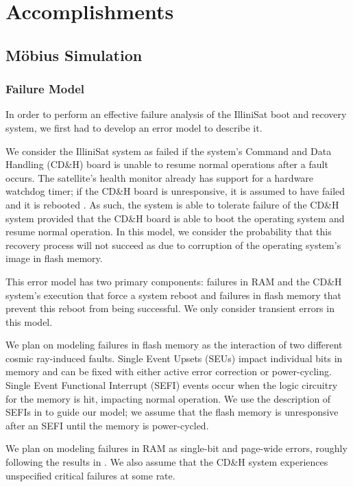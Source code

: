 \section{Accomplishments}

\subsection{M\"obius Simulation}

\subsubsection{Failure Model}

In order to perform an effective failure analysis of the IlliniSat boot and recovery system, we first had to develop an error model to describe it.

We consider the IlliniSat system as failed if the system's Command and Data Handling (CD\&H) board is unable to resume normal operations after a fault occurs.  The satellite's health monitor already has support for a hardware watchdog timer; if the CD\&H board is unresponsive, it is assumed to have failed and it is rebooted \cite{jagannatha2014command}.  As such, the system is able to tolerate failure of the CD\&H system provided that the CD\&H board is able to boot the operating system and resume normal operation.  In this model, we consider the probability that this recovery process will not succeed as due to corruption of the operating system's image in flash memory.

This error model has two primary components: failures in RAM and the CD\&H system's execution that force a system reboot and failures in flash memory that prevent this reboot from being successful.  We only consider transient errors in this model.

We plan on modeling failures in flash memory as the interaction of two different cosmic ray-induced faults.  Single Event Upsets (SEUs) impact individual bits in memory and can be fixed with either active error correction or power-cycling.  Single Event Functional Interrupt (SEFI) events occur when the logic circuitry for the memory is hit, impacting normal operation.  We use the description of SEFIs in \cite{Gerardin2010Present} to guide our model; we assume that the flash memory is unresponsive after an SEFI until the memory is power-cycled.  

We plan on modeling failures in RAM as single-bit and page-wide errors, roughly following the results in \cite{Herrmann2013InSitu}.  We also assume that the CD\&H system experiences unspecified critical failures at some rate.

